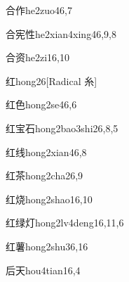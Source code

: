 \begin{verbete}{合作}{he2zuo4}{6,7}
\end{verbete}

\begin{verbete}{合宪性}{he2xian4xing4}{6,9,8}
\end{verbete}

\begin{verbete}{合资}{he2zi1}{6,10}
\end{verbete}

\begin{verbete}{红}{hong2}{6}[Radical 糸]
\end{verbete}

\begin{verbete}{红色}{hong2se4}{6,6}
\end{verbete}

\begin{verbete}{红宝石}{hong2bao3shi2}{6,8,5}
\end{verbete}

\begin{verbete}{红线}{hong2xian4}{6,8}
\end{verbete}

\begin{verbete}{红茶}{hong2cha2}{6,9}
\end{verbete}

\begin{verbete}{红烧}{hong2shao1}{6,10}
\end{verbete}

\begin{verbete}{红绿灯}{hong2lv4deng1}{6,11,6}
\end{verbete}

\begin{verbete}{红薯}{hong2shu3}{6,16}
\end{verbete}

\begin{verbete}{后天}{hou4tian1}{6,4}
\end{verbete}

